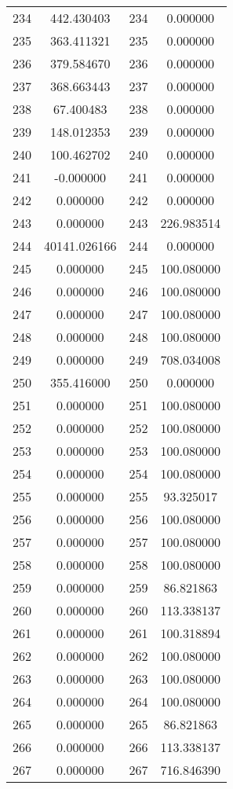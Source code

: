 \documentclass[12pt]{article}
\begin{document}
\begin{longtable}{@{}cccc@{}}
234 & 442.430403 & 234 & 0.000000 \\
235 & 363.411321 & 235 & 0.000000 \\
236 & 379.584670 & 236 & 0.000000 \\
237 & 368.663443 & 237 & 0.000000 \\
238 & 67.400483 & 238 & 0.000000 \\
239 & 148.012353 & 239 & 0.000000 \\
240 & 100.462702 & 240 & 0.000000 \\
241 & -0.000000 & 241 & 0.000000 \\
242 & 0.000000 & 242 & 0.000000 \\
243 & 0.000000 & 243 & 226.983514 \\
244 & 40141.026166 & 244 & 0.000000 \\
245 & 0.000000 & 245 & 100.080000 \\
246 & 0.000000 & 246 & 100.080000 \\
247 & 0.000000 & 247 & 100.080000 \\
248 & 0.000000 & 248 & 100.080000 \\
249 & 0.000000 & 249 & 708.034008 \\
250 & 355.416000 & 250 & 0.000000 \\
251 & 0.000000 & 251 & 100.080000 \\
252 & 0.000000 & 252 & 100.080000 \\
253 & 0.000000 & 253 & 100.080000 \\
254 & 0.000000 & 254 & 100.080000 \\
255 & 0.000000 & 255 & 93.325017 \\
256 & 0.000000 & 256 & 100.080000 \\
257 & 0.000000 & 257 & 100.080000 \\
258 & 0.000000 & 258 & 100.080000 \\
259 & 0.000000 & 259 & 86.821863 \\
260 & 0.000000 & 260 & 113.338137 \\
261 & 0.000000 & 261 & 100.318894 \\
262 & 0.000000 & 262 & 100.080000 \\
263 & 0.000000 & 263 & 100.080000 \\
264 & 0.000000 & 264 & 100.080000 \\
265 & 0.000000 & 265 & 86.821863 \\
266 & 0.000000 & 266 & 113.338137 \\
267 & 0.000000 & 267 & 716.846390 \\

\end{longtable}
\end{document}
